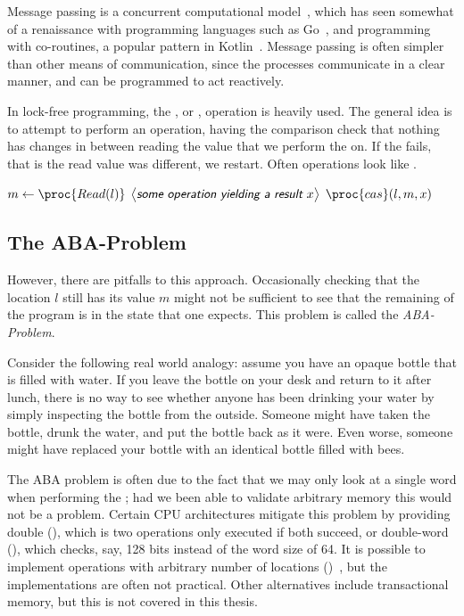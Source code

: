 Message passing is a concurrent computational model~\cite{hewitt1973session}, which has seen
somewhat of a renaissance with programming languages such as Go~\cite{go}, and programming with
co-routines, a popular pattern in Kotlin~\cite{kotlin}. Message passing is often simpler than other
means of communication, since the processes communicate in a clear manner, and can be programmed to
act reactively.

In lock-free programming, the , or , operation is heavily used.
The general idea is to attempt to perform an operation, having the comparison check that nothing
has changes in between reading the value that we perform the  on. If the 
fails, that is the read value was different, we restart. Often operations look like
.

\begin{codebox}
\li \While \Then
\li $m \gets \proc{Read(l)}$
\li $\lit{some operation yielding a result $x$}$
\li \If $\proc{cas}(l, m, x)$ \Then
\li \Return
\End \End
\end{codebox}

\subsection{The ABA-Problem\label{sec:aba-problem}}

However, there are pitfalls to this approach. Occasionally checking that the location $l$ still has
its value $m$ might not be sufficient to see that the remaining of the program is in the state that
one expects. This problem is called the \emph{ABA-Problem}.

Consider the following real world analogy: assume you have an opaque bottle that is filled with
water. If you leave the bottle on your desk and return to it after lunch, there is no way to see
whether anyone has been drinking your water by simply inspecting the bottle from the outside.
Someone might have taken the bottle, drunk the water, and put the bottle back as it were. Even
worse, someone might have replaced your bottle with an identical bottle filled with bees.

The ABA problem is often due to the fact that we may only look at a single word when performing the
; had we been able to validate arbitrary memory this would not be a problem. Certain CPU
architectures mitigate this problem by providing double  (), which
is two  operations only executed if both succeed, or double-word 
(), which checks, say, 128 bits instead of the word size of 64.  It is possible to
implement  operations with arbitrary number of locations
()~\cite{harris2002practical,luchangco2003nonblocking}, but the implementations are often
not practical. Other alternatives include transactional memory, but this is not covered in this
thesis.



